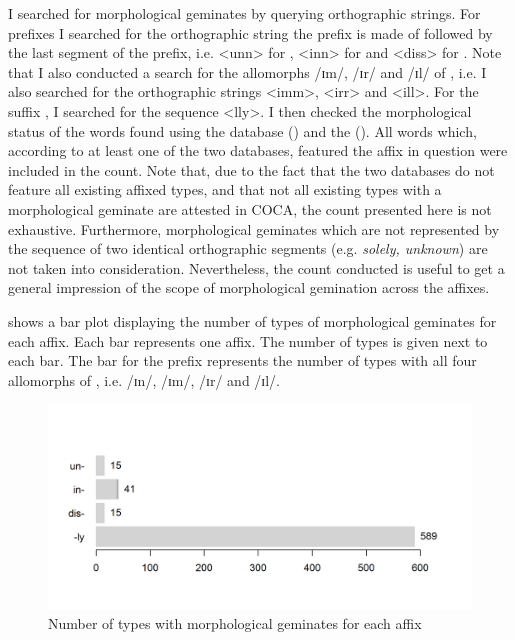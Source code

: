 I searched for morphological geminates by querying orthographic strings. For prefixes I searched for the orthographic string the prefix is made of followed by the last segment of the prefix, i.e. <unn> for ,  <inn> for  and  <diss> for . Note that I also conducted a search for the allomorphs /ɪm/, /ɪr/ and /ɪl/ of , i.e. I also searched for the orthographic strings  <imm>, <irr> and <ill>.  For the suffix , I searched for the sequence <lly>.  I then checked the morphological status of the words found using the  database (\citealt{Baayen.1995}) and the  (\citealt{Balota.2007}). All words which, according to at least one of the two databases, featured the affix in question were included in the count. 
Note that, due to the fact that the two databases do not feature all existing affixed types, and that not all existing types with a morphological geminate are attested in COCA, the count presented here is not exhaustive. Furthermore, morphological geminates which are not represented by the sequence of two identical orthographic segments (e.g. \textit{solely, unknown}) are not taken into consideration. Nevertheless, the count conducted is useful to get a general impression of the scope of morphological gemination across the affixes.
 
  shows a bar plot displaying the number of types of morphological geminates for each affix. Each bar represents one affix. The number of types is given next to each bar. The bar for the prefix   represents the number of types with all four allomorphs of , i.e. /ɪn/, /ɪm/, /ɪr/ and /ɪl/. 
 
\begin{figure} [t!]
	
	\includegraphics[scale=0.75]{images/Theory/NumberOfMorphGemAffixes.png}
	\caption{ Number of types with morphological geminates for each affix}
	\label{fig:morphological geminates for each affix}
\end{figure}

